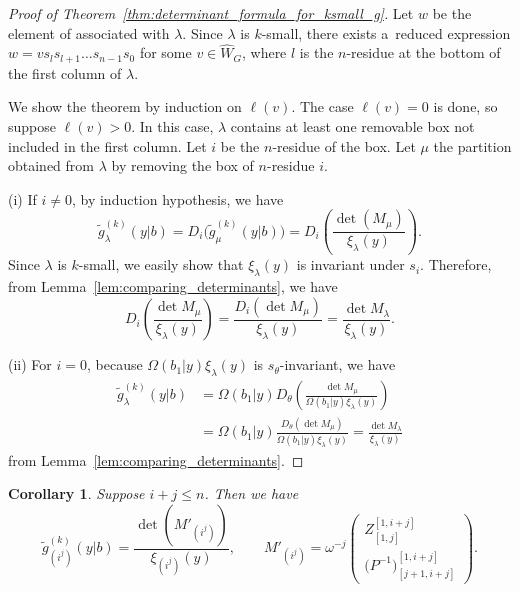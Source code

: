 \documentclass[10pt,a4paper]{amsart}
\numberwithin{equation}{section}
\newcommand{\co}{\xi}
\newcommand{\la}{\lambda}
\newtheorem{Corollary}[Theorem]{Corollary}
\theoremstyle{definition}
\begin{document}
\begin{proof}[Proof of Theorem~\ref{thm:determinant_formula_for_ksmall_g}]
Let $w$ be the element of  associated with $\lambda$.
Since $\lambda$ is $k$-small, there exists a~reduced expression $w=vs_ls_{l+1}\dots s_{n-1}s_0$ for some \label{$w'$ is not affine Grassmannian.}
$v\in \hat{W}_{G}$, where $l$ is the $n$-residue at the bottom of the first column of $\lambda$.


We show the theorem by induction on $\ell(v)$.
The case $\ell(v)=0$ is done, so suppose $\ell(v)>0$.
In this case, $\lambda$ contains at least one removable box
not included in the first column.
Let $i$ be the $n$-residue of the box.
Let $\mu$ the partition obtained from $\la$ by removing
the box of $n$-residue $i$.

(i) If $i\neq 0$, by induction hypothesis, we have
\[
\tilde{g}^{(k)}_\lambda(y|b)=
D_i\bigl(
\tilde{g}^{(k)}_{\mu}(y|b)
\bigr)
=
D_i
\left(
\frac{
\det(M_{\mu})
}{\co_\la(y)}
\right).
\]
Since $\lambda$ is $k$-small, we easily show that $\co_\la(y)$ is invariant under $s_i$.
Therefore, from Lemma~\ref{lem:comparing_determinants}, we have
\[
D_{i}\left(
\frac{\det M_{\mu}}{\co_\la(y)}
\right)
=
\frac{
D_{i}(\det M_{\mu})}{\co_\la(y)}
=
\frac{\det M_{\lambda}}{\co_\la(y)}.
\]

(ii) For $i=0$, because $\Omega(b_1|y)\co_\la(y)$ is $s_\theta$-invariant, we have
\[
\begin{aligned}
\tilde{g}^{(k)}_\lambda(y|b)
&
=
\Omega(b_1|y)
D_\theta
\left(
\frac{
\det M_{\mu}
}{\Omega(b_1|y)\co_\la(y)}
\right)\\
&
=
\Omega(b_1|y)
\frac{
D_\theta(\det M_{\mu})}{\Omega(b_1|y)\co_\la(y)}
=
\frac{\det M_{\lambda}}{\co_\la(y)}
\end{aligned}
\]
from Lemma~\ref{lem:comparing_determinants}.
\end{proof}

\begin{Corollary}\label{cor:g_rectangle}
Suppose $i+j\le n$.
Then we have
\[
\tilde{g}^{(k)}_{(i^j)}(y|b)=
\frac{
\det(M'_{(i^j)})
}{\co_{(i^j)}(y)},\qquad
M'_{(i^j)}=\omega^{-j}
\left(
\begin{matrix}
Z_{[1,j]}^{[1,i+j]}\\\hline
{
\bigl(P^{-1}\bigr)}^{[1,i+j]}_{[j+1,i+j]}
\end{matrix}
\right).
\]
\end{Corollary}
\end{document}
